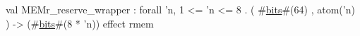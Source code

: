 val MEMr_reserve_wrapper : forall 'n, 1 <= 'n <= 8 . ( #\hyperref[zbits]{bits}#(64) , atom('n) ) -> (#\hyperref[zbits]{bits}#(8 * 'n)) effect { rmem }
